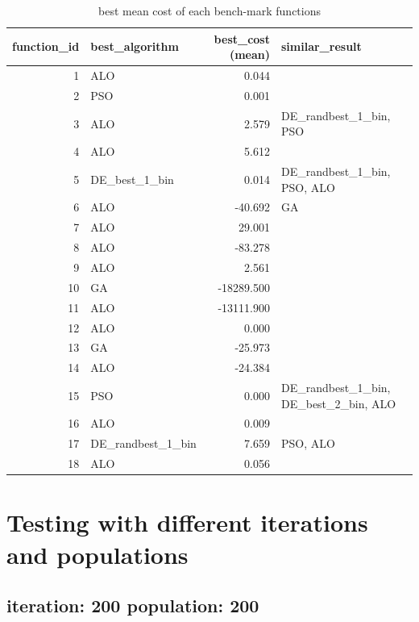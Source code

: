 \documentclass[12pt]{article}
\begin{document}
\begin{table}[H]
    \centering
    \scriptsize
    \begin{tabular}{rlrp{}}
        \toprule
        function\_id &     best\_algorithm &  best\_cost (mean) &                         similar\_result \\
        \midrule
        1 &  ALO & 0.044 &   \\
        2 &  PSO & 0.001 &   \\
        3 &  ALO & 2.579 &  DE\_randbest\_1\_bin, PSO \\
        4 &  ALO & 5.612 &   \\
        5 &  DE\_best\_1\_bin & 0.014 &  DE\_randbest\_1\_bin, PSO, ALO \\
        6 &  ALO & -40.692 &  GA \\
        7 &  ALO & 29.001 &   \\
        8 &  ALO & -83.278 &   \\
        9 &  ALO & 2.561 &   \\
        10 &  GA & -18289.500 &   \\
        11 &  ALO & -13111.900 &   \\
        12 &  ALO & 0.000 &   \\
        13 &  GA & -25.973 &   \\
        14 &  ALO & -24.384 &   \\
        15 &  PSO & 0.000 &  DE\_randbest\_1\_bin, DE\_best\_2\_bin, ALO \\
        16 &  ALO & 0.009 &   \\
        17 &  DE\_randbest\_1\_bin & 7.659 &  PSO, ALO \\
        18 &  ALO & 0.056 &   \\
        \bottomrule
    \end{tabular}
    \caption{best mean cost of each bench-mark functions} 
    \label{tab:summary_best}
\end{table}



\section{Testing with different iterations and populations}
\subsection{iteration: 200 population: 200}
\end{document}
